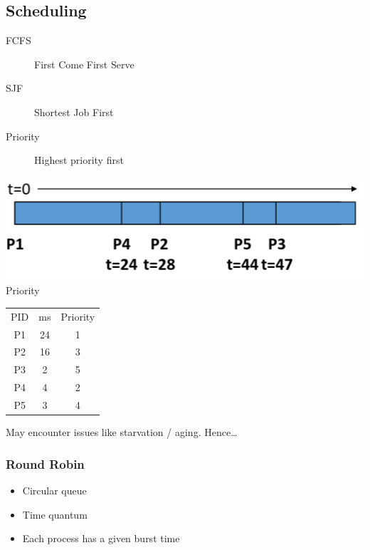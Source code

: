 \documentclass[a4paper]{article}
\begin{document}
\begin{multicols*}{2}
    \subsection*{Scheduling}
    \begin{multicols*}{2}
        \begin{description}
            \item[FCFS] First Come First Serve
            \item[SJF] Shortest Job First
            \item[Priority] Highest priority first
        \end{description}
        \begin{center}
            \includegraphics[width=\columnwidth]{result.png}
            Priority
        \end{center}
        \columnbreak
        \begin{tabular}{|c|c|c|}
            \hline
            PID & ms & Priority \\
            P1  & 24 & 1        \\
            P2  & 16 & 3        \\
            P3  & 2  & 5        \\
            P4  & 4  & 2        \\
            P5  & 3  & 4        \\
            \hline
        \end{tabular}
    \end{multicols*}
    May encounter issues like starvation / aging. Hence\dots

    \subsubsection*{Round Robin}
    \begin{itemize}
        \item Circular queue
        \item Time quantum
        \item Each process has a given burst time
    \end{itemize}
\end{multicols*}
\end{document}
